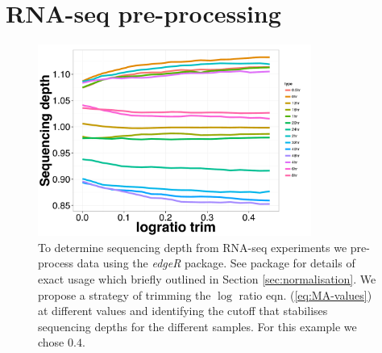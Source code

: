 
\chapter{RNA-seq pre-processing}
\label{cha:mcf10a-results}
\label{sec:sequencing-depth-rna}

\begin{figure}[!h]
  \centering
  \includegraphics[width=0.8\textwidth]{pics/sequencing-depth.pdf}
  \caption{To determine sequencing depth from RNA-seq experiments we pre-process data using the \emph{edgeR} package. See package \cite{Robinson:2010cw} for details of exact usage which briefly outlined in Section \ref{sec:normalisation}. We propose a strategy of trimming the $\log$ ratio eqn. (\ref{eq:MA-values}) at different values and identifying the cutoff that stabilises sequencing depths for the different samples. For this example we chose $0.4$.}
  \label{fig:seq-depth}
\end{figure}

